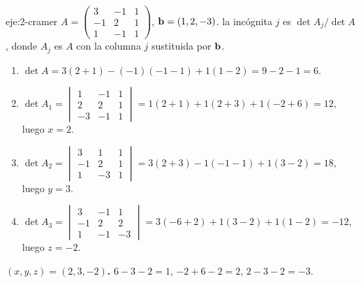 \begin{solucion}{eje:2-cramer}
\datos $A=\begin{pmatrix}3&-1&1\\-1&2&1\\1&-1&1\end{pmatrix}$, $\mathbf{b}=(1,2,-3)$.
\planteamiento la incógnita $j$ es $\det A_j/\det A$, donde $A_j$ es $A$ con la columna $j$ sustituida por $\mathbf{b}$.
\pasos
\begin{enumerate}[label=\arabic*.]
  \item $\det A=3(2+1)-(-1)(-1-1)+1(1-2)=9-2-1=6$.
  \item $\det A_1=\begin{vmatrix}1&-1&1\\2&2&1\\-3&-1&1\end{vmatrix}=1(2+1)+1(2+3)+1(-2+6)=12$, luego $x=2$.
  \item $\det A_2=\begin{vmatrix}3&1&1\\-1&2&1\\1&-3&1\end{vmatrix}=3(2+3)-1(-1-1)+1(3-2)=18$, luego $y=3$.
  \item $\det A_3=\begin{vmatrix}3&-1&1\\-1&2&2\\1&-1&-3\end{vmatrix}=3(-6+2)+1(3-2)+1(1-2)=-12$, luego $z=-2$.
\end{enumerate}
\resultado \textbf{$(x,y,z)=(2,3,-2)$.}
\comprobacion $6-3-2=1$, $-2+6-2=2$, $2-3-2=-3$.
\end{solucion}

